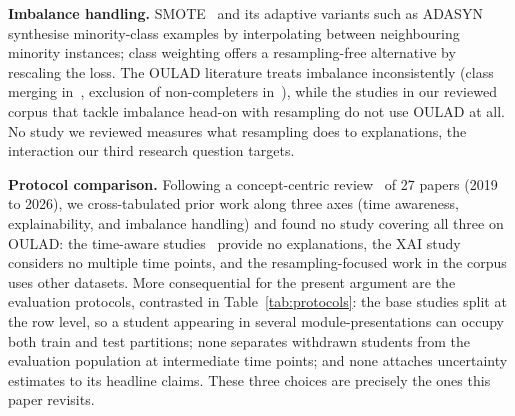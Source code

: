 \documentclass[conference]{IEEEtran}
\begin{document}
\textbf{Imbalance handling.}
SMOTE~\cite{chawla2002} and its adaptive variants such as
ADASYN~\cite{he2008} synthesise minority-class examples by interpolating
between neighbouring minority instances; class weighting offers a resampling-free alternative by rescaling
the loss. The OULAD literature treats imbalance inconsistently (class
merging in~\cite{adnan2021}, exclusion of non-completers
in~\cite{tomasevic2020}), while the studies in our reviewed corpus that
tackle imbalance head-on with resampling do not use OULAD at all. No study
we reviewed measures what resampling does to explanations, the interaction
our third research question targets.

\textbf{Protocol comparison.}
Following a concept-centric review~\cite{webster2002} of 27 papers
(2019 to 2026), we cross-tabulated prior work along three axes (time
awareness, explainability, and imbalance handling) and found no study
covering all three on OULAD: the time-aware studies~\cite{tomasevic2020,
adnan2021} provide no explanations, the XAI study~\cite{gunasekara2025}
considers no multiple time points, and the resampling-focused work in the
corpus uses other datasets. More consequential for the present argument are
the evaluation protocols, contrasted in Table~\ref{tab:protocols}: the base
studies split at the row level, so a student appearing in several
module-presentations can occupy both train and test partitions; none
separates withdrawn students from the evaluation population at intermediate
time points; and none attaches uncertainty estimates to its headline claims.
These three choices are precisely the ones this paper revisits.
\end{document}

